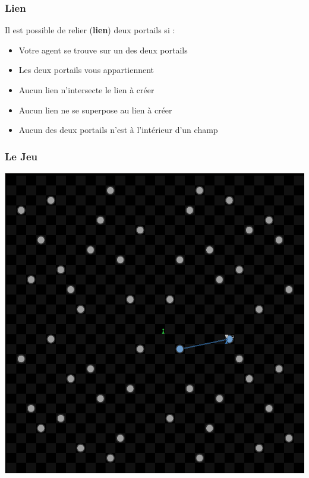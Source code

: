 \documentclass{beamer}
\begin{document}
\begin{frame}
	\frametitle{Lien}
    Il est possible de relier (\textbf{lien}) deux portails si :
	\begin{itemize}
        \item Votre agent se trouve sur un des deux portails
        \item Les deux portails vous appartiennent
        \item Aucun lien n'intersecte le lien à créer
        \item Aucun lien ne se superpose au lien à créer
        \item Aucun des deux portails n'est à l'intérieur d'un champ
	\end{itemize}
\end{frame}

\begin{frame}
    \begin{center}
        \frametitle{Le Jeu}
        \includegraphics[height=0.8\textheight]{gui_link}
    \end{center}
\end{frame}
\end{document}
